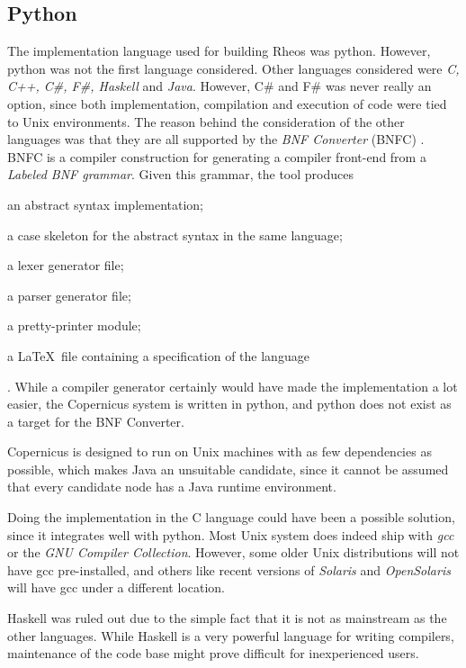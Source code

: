 \subsection{Python}
The implementation language used for building Rheos was
python. However, python was not the first language considered. Other
languages considered were \emph{C, C++, C\#, F\#, Haskell} and
\emph{Java}. However, C\# and F\# was never really an option, since
both implementation, compilation and execution of code were tied to
Unix environments. The reason behind the consideration of the other
languages was that they are all supported by the \emph{BNF Converter}
(BNFC) \citep{bnfc:online}. BNFC is a compiler construction for
generating a compiler front-end from a \emph{Labeled BNF
  grammar}. Given this grammar, the tool produces
\begin{inparaenum}[(1)]
\item an abstract syntax implementation;
\item a case skeleton for the abstract syntax in the same language;
\item a lexer generator file;
\item a parser generator file;
\item a pretty-printer module;
\item a \LaTeX~file containing a specification of the language
\end{inparaenum} \citep{bnfc:online}.
While a compiler generator certainly would have made the
implementation a lot easier, the Copernicus system is written in
python, and python does not exist as a target for the BNF Converter.

Copernicus is designed to run on Unix machines with as few
dependencies as possible, which makes Java an unsuitable candidate,
since it cannot be assumed that every candidate node has a Java
runtime environment.

Doing the implementation in the C language could have been a possible
solution, since it integrates well with python. Most Unix system does
indeed ship with \emph{gcc} or the \emph{GNU Compiler
  Collection}. However, some older Unix distributions will not have
gcc pre-installed, and others like recent versions of \emph{Solaris}
and \emph{OpenSolaris} will have gcc under a different location.

Haskell was ruled out due to the simple fact that it is not as
mainstream as the other languages. While Haskell is a very powerful
language for writing compilers, maintenance of the code base might
prove difficult for inexperienced users.

